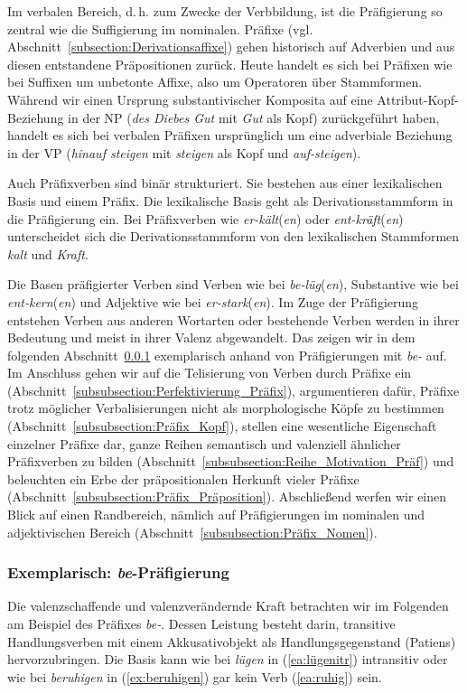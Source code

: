 Im verbalen Bereich, d.\,h. zum Zwecke der Verbbildung, ist die Präfigierung so zentral wie die Suffigierung im nominalen. Präfixe (vgl. Abschnitt~\ref{subsection:Derivationsaffixe}) gehen historisch auf Adverbien und aus diesen entstandene Präpositionen zurück. Heute handelt es sich bei Präfixen wie bei Suffixen um unbetonte Affixe, also um Operatoren über Stammformen. Während wir einen Ursprung substantivischer Komposita auf eine Attribut-Kopf-Beziehung in der NP (\textit{des Diebes Gut} mit \textit{Gut} als Kopf) zurückgeführt haben, handelt es sich bei verbalen Präfixen ursprünglich um eine adverbiale Beziehung in der VP (\textit{hinauf steigen} mit \textit{steigen} als Kopf und \textit{auf-steigen}).   

Auch Präfixverben sind binär strukturiert. Sie bestehen aus einer lexikalischen Basis und einem Präfix. Die lexikalische Basis geht als Derivationsstammform in die Präfigierung ein. Bei Präfixverben wie \textit{er-kält}(\textit{en}) oder \textit{ent-kräft}(\textit{en}) unterscheidet sich die Derivationsstammform von den lexikalischen Stammformen \textit{kalt} und \textit{Kraft}.  

Die Basen präfigierter Verben sind Verben wie bei \textit{be-lüg}(\textit{en}), Substantive wie bei \textit{ent-kern}(\textit{en}) und Adjektive wie bei \textit{er-stark}(\textit{en}). Im Zuge der Präfigierung entstehen Verben aus anderen Wortarten oder bestehende Verben werden in ihrer Bedeutung und meist in ihrer Valenz abgewandelt. Das zeigen wir in dem folgenden Abschnitt~\ref{subsubsection:be_Präfix} exemplarisch anhand von Präfigierungen mit \textit{be-} auf. Im Anschluss gehen wir auf die Telisierung von Verben durch Präfixe ein (Abschnitt~\ref{subsubsection:Perfektivierung_Präfix}), argumentieren dafür, Präfixe trotz möglicher Verbalisierungen nicht als morphologische Köpfe zu bestimmen (Abschnitt~\ref{subsubsection:Präfix_Kopf}), stellen eine wesentliche Eigenschaft einzelner Präfixe dar, ganze Reihen semantisch und valenziell ähnlicher Präfixverben zu bilden (Abschnitt~\ref{subsubsection:Reihe_Motivation_Präf}) und beleuchten ein Erbe der präpositionalen Herkunft vieler Präfixe (Abschnitt~\ref{subsubsection:Präfix_Präposition}). Abschließend werfen wir einen Blick auf einen Randbereich, nämlich auf Präfigierungen im nominalen und adjektivischen Bereich (Abschnitt~\ref{subsubsection:Präfix_Nomen}).   

 

\subsubsection{Exemplarisch:  \textit{be}-Präfigierung}\label{subsubsection:be_Präfix}
\largerpage
Die valenzschaffende und valenzverändernde Kraft betrachten wir im Folgenden am Beispiel des Präfixes \textit{be-}. Dessen Leistung besteht darin, transitive Handlungsverben mit einem Akkusativobjekt als Handlungsgegenstand (Patiens) hervorzubringen. Die Basis kann wie bei \textit{lügen} in (\ref{ea:lügenitr}) intransitiv oder wie bei \textit{beruhigen} in (\ref{ex:beruhigen}) gar kein Verb (\ref{ea:ruhig}) sein.  

